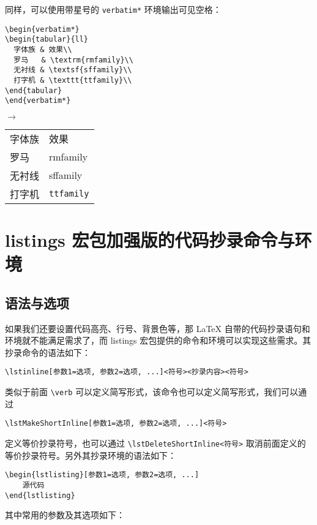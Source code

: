 \documentclass[UTF8,hyperref]{ctexart}
\begin{document}
同样，可以使用带星号的 \verb|verbatim*| 环境输出可见空格：
\begin{flushleft}
\begin{minipage}{0.38\linewidth}
\begin{verbatim}
\begin{verbatim*}
\begin{tabular}{ll}
  字体族 & 效果\\
  罗马   & \textrm{rmfamily}\\
  无衬线 & \textsf{sffamily}\\
  打字机 & \texttt{ttfamily}\\
\end{tabular}
\end{verbatim*}
\end{verbatim}
\end{minipage}
$\rightarrow$
\begin{minipage}{0.45\linewidth}
\begin{verbatim*}
\begin{tabular}{ll}
  字体族 & 效果\\
  罗马   & \textrm{rmfamily}\\
  无衬线 & \textsf{sffamily}\\
  打字机 & \texttt{ttfamily}\\
\end{tabular}
\end{verbatim*}
\end{minipage}
\end{flushleft}


\section{listings 宏包加强版的代码抄录命令与环境}

\subsection{语法与选项}
\label{subsec: syntax and option}

如果我们还要设置代码高亮、行号、背景色等，那 LaTeX 自带的代码抄录语句和环境就不能满足需求了，而 listings 宏包提供的命令和环境可以实现这些需求。其抄录命令的语法如下：
\begin{flushleft}
\verb|\lstinline[参数1=选项, 参数2=选项, ...]<符号><抄录内容><符号>|
\end{flushleft}
类似于前面 \verb!\verb! 可以定义简写形式，该命令也可以定义简写形式，我们可以通过
\begin{flushleft}
\verb!\lstMakeShortInline[参数1=选项, 参数2=选项, ...]<符号>!
\end{flushleft}
定义等价抄录符号，也可以通过 \verb!\lstDeleteShortInline<符号>! 取消前面定义的等价抄录符号。另外其抄录环境的语法如下：
\begin{flushleft}
\begin{verbatim}
\begin{lstlisting}[参数1=选项, 参数2=选项, ...]
    源代码
\end{lstlisting}
\end{verbatim}
\end{flushleft}
其中常用的参数及其选项如下：
\end{document}
